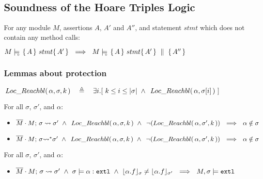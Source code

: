 \subsection{Soundness of the Hoare Triples Logic}
\label{s:sound:app:triples}

\begin{auxLemma}
\label{l:no:call}
For any module $M$, assertions $A$, $A'$ and $A''$, and statement $stmt$ which does not contain any method calls:
\begin{center}
$  \satisfiesD {M} {\triple {A} {stmt} {A'} }  \ \ \Longrightarrow\ \  \satisfiesD {M} {\quadruple {A} {stmt} {A'} {A''}}$
\end{center}
\end{auxLemma}




\subsubsection{Lemmas about protection}
\label{s:app:protect:lemmas}

\begin{definition}

$\LRelevantK {\alpha} {\sigma} {k}\ \ \ \triangleq\ \ \  \exists i.[ \ k \leq i \leq \depth \sigma \ \wedge \ \LRelevant {\alpha} {\RestictTo \sigma i}\ ]$
\end{definition}
 

{
\begin{lemma} For all $\sigma$, $\sigma'$, and $\alpha$:
\begin{itemize}
\item
$\leadstoBounded  {\Mtwo\cdot M}  {\sigma}  {\sigma'}\ \wedge \ \LRelevantK {\alpha} {\sigma} {k}\ \wedge\  \NotLRelevantK {\alpha} {\sigma'} {k} \ \ \Longrightarrow\ \ \alpha\notin\sigma$
\item
$\leadstoBoundedStar  {\Mtwo\cdot M}  {\sigma}  {\sigma'}\ \wedge \ \LRelevantK {\alpha} {\sigma} {k}\ \wedge \  \NotLRelevantK {\alpha} {\sigma'} {k} \ \  \Longrightarrow\ \ \alpha\notin\sigma$
\end{itemize}
\end{lemma}
 }
 
 {
 \begin{lemma} For all $\sigma$, $\sigma'$, and $\alpha$:
\begin{itemize}
\item
$\leadstoBounded  {\Mtwo\cdot M}  {\sigma}  {\sigma'}\ \wedge \  \sigma \models \external{\alpha} \ \wedge\  {\interpret{\sigma} {\alpha.f}} \neq {\interpret{\sigma'} {\alpha.f}}
 \ \ \Longrightarrow\ \  M,\sigma \models \extThis$
\end{itemize}
\end{lemma}
  } 
    
